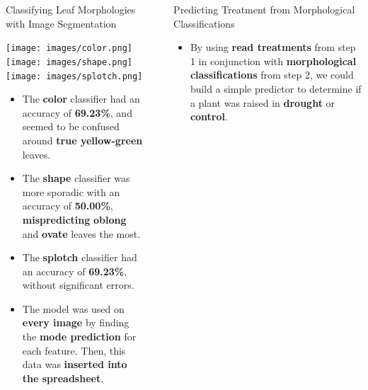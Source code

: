 \documentclass[final]{beamer}
\newlength{\sepwidth}
\newlength{\colwidth}
\newcommand{\separatorcolumn}{\begin{column}{\sepwidth}\end{column}}
\begin{document}
\begin{frame}[t]
\begin{columns}[t]
\begin{column}{\colwidth}
\begin{block}{Classifying Leaf Morphologies with Image Segmentation}

\vspace{-0.5em}

\begin{center}
    \texttt{[image: images/color.png]}
    \texttt{[image: images/shape.png]}
    \texttt{[image: images/splotch.png]}
\end{center}


\vspace{-1em}

\begin{itemize}
    \item The \textbf{color} classifier had an accuracy of \textbf{69.23\%}, and seemed to be confused around \textbf{true yellow-green} leaves.
    \item The \textbf{shape} classifier was more sporadic with an accuracy of \textbf{50.00\%}, \textbf{mispredicting} \textbf{oblong} and \textbf{ovate} leaves the most.
    \item The \textbf{splotch} classifier had an accuracy of \textbf{69.23\%}, without significant errors.
    \item The model was used on \textbf{every image} by finding the \textbf{mode prediction} for each feature. Then, this data was \textbf{inserted into the spreadsheet}. 
\end{itemize}


\end{block}

\end{column}

\separatorcolumn

\begin{column}{\colwidth}

\begin{block}{Predicting Treatment from Morphological Classifications}


\begin{itemize}
    \item By using \textbf{read treatments} from step 1 in conjunction with \textbf{morphological classifications} from step 2, we could build a simple predictor to determine if a plant was raised in \textbf{drought} or \textbf{control}.
\end{itemize}


\end{block}
\end{column}
\end{columns}
\end{frame}
\end{document}
